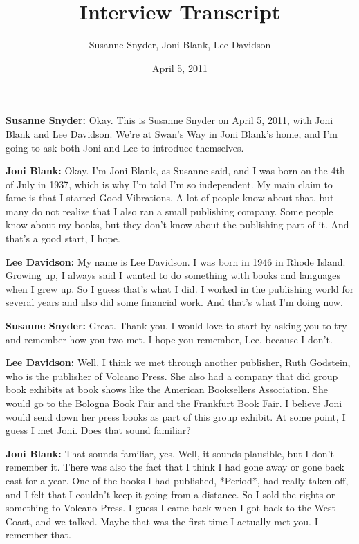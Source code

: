\documentclass{article}
\begin{document}
\title{Interview Transcript}
\author{Susanne Snyder, Joni Blank, Lee Davidson}
\date{April 5, 2011}
\maketitle

\textbf{Susanne Snyder:} Okay. This is Susanne Snyder on April 5, 2011, with Joni Blank and Lee Davidson. We're at Swan's Way in Joni Blank's home, and I'm going to ask both Joni and Lee to introduce themselves.

\textbf{Joni Blank:} Okay. I'm Joni Blank, as Susanne said, and I was born on the 4th of July in 1937, which is why I'm told I'm so independent. My main claim to fame is that I started Good Vibrations. A lot of people know about that, but many do not realize that I also ran a small publishing company. Some people know about my books, but they don't know about the publishing part of it. And that's a good start, I hope.

\textbf{Lee Davidson:} My name is Lee Davidson. I was born in 1946 in Rhode Island. Growing up, I always said I wanted to do something with books and languages when I grew up. So I guess that's what I did. I worked in the publishing world for several years and also did some financial work. And that's what I'm doing now.

\textbf{Susanne Snyder:} Great. Thank you. I would love to start by asking you to try and remember how you two met. I hope you remember, Lee, because I don't.

\textbf{Lee Davidson:} Well, I think we met through another publisher, Ruth Godstein, who is the publisher of Volcano Press. She also had a company that did group book exhibits at book shows like the American Booksellers Association. She would go to the Bologna Book Fair and the Frankfurt Book Fair. I believe Joni would send down her press books as part of this group exhibit. At some point, I guess I met Joni. Does that sound familiar?

\textbf{Joni Blank:} That sounds familiar, yes. Well, it sounds plausible, but I don't remember it. There was also the fact that I think I had gone away or gone back east for a year. One of the books I had published, *Period*, had really taken off, and I felt that I couldn't keep it going from a distance. So I sold the rights or something to Volcano Press. I guess I came back when I got back to the West Coast, and we talked. Maybe that was the first time I actually met you. I remember that.
\end{document}
